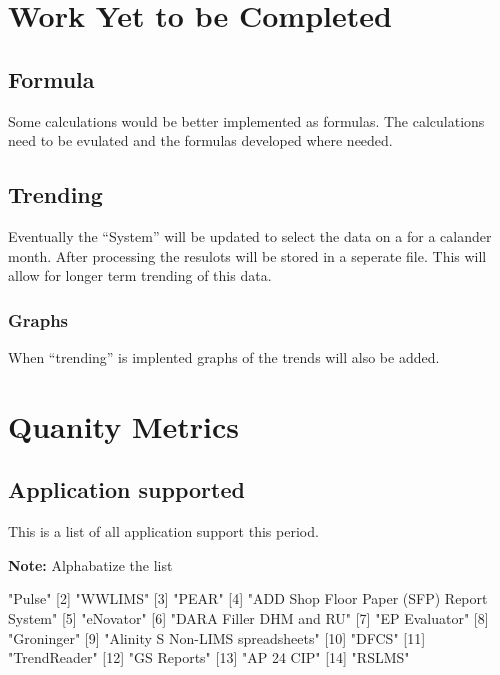 \documentclass{article}
\begin{document}
\section{Work Yet to be Completed}
\subsection{Formula}
Some calculations would be better implemented as formulas. The calculations need
to be evulated and the formulas developed where needed.
\subsection{Trending}
Eventually the ``System'' will be updated to select the data on a for a calander
month. After processing the resulots will be stored in a seperate file.
This will allow for longer term trending of this data.
\subsubsection{Graphs}
When ``trending'' is implented graphs of the trends will also be added.


\section{Quanity Metrics}
\subsection{Application supported}
This is a list of all application support this period.

\textbf{Note:} Alphabatize the list

\begin{Schunk}
\begin{Soutput}
 [1] "Pulse"                                   
 [2] "WWLIMS"                                  
 [3] "PEAR"                                    
 [4] "ADD Shop Floor Paper (SFP) Report System"
 [5] "eNovator"                                
 [6] "DARA Filler DHM and RU"                  
 [7] "EP Evaluator"                            
 [8] "Groninger"                               
 [9] "Alinity S Non-LIMS spreadsheets"         
[10] "DFCS"                                    
[11] "TrendReader"                             
[12] "GS Reports"                              
[13] "AP 24 CIP"                               
[14] "RSLMS"                                   
\end{Soutput}
\end{Schunk}
\end{document}
